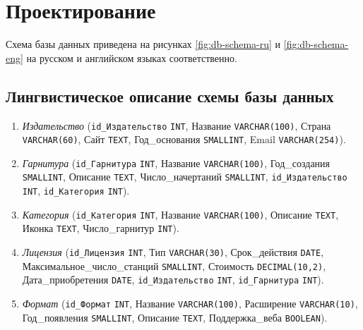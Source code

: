 \section{Проектирование}
Схема базы данных приведена на рисунках \ref{fig:db-schema-ru} и \ref{fig:db-schema-eng} на русском и английском языках соответственно.

\subsection{Лингвистическое описание схемы базы данных}

\begin{enumerate}
    \item \textit{Издательство} (\texttt{id_Издательство} \texttt{INT},
    Название \texttt{VARCHAR(100)},
    Страна \texttt{VARCHAR(60)},
    Сайт \texttt{TEXT},
    Год\_основания \texttt{SMALLINT},
    Email \texttt{VARCHAR(254)}).

    \item \textit{Гарнитура} (\texttt{id_Гарнитура} \texttt{INT},
    Название \texttt{VARCHAR(100)},
    Год\_создания \texttt{SMALLINT},
    Описание \texttt{TEXT},
    Число\_начертаний \texttt{SMALLINT},
    \texttt{id_Издательство} \texttt{INT},
    \texttt{id_Категория} \texttt{INT}).

    \item \textit{Категория} (\texttt{id_Категория} \texttt{INT},
    Название \texttt{VARCHAR(100)},
    Описание \texttt{TEXT},
    Иконка \texttt{TEXT},
    Число\_гарнитур \texttt{INT}).

    \item \textit{Лицензия} (\texttt{id_Лицензия} \texttt{INT},
    Тип \texttt{VARCHAR(30)},
    Срок\_действия \texttt{DATE},
    Максимальное\_число\_станций \texttt{SMALLINT},
    Стоимость \texttt{DECIMAL(10,2)},\newline
    Дата\_приобретения \texttt{DATE},
    \texttt{id_Издательство} \texttt{INT},
    \texttt{id_Гарнитура} \texttt{INT}).

    \item \textit{Формат} (\texttt{id_Формат} \texttt{INT},
    Название \texttt{VARCHAR(100)},
    Расширение \texttt{VARCHAR(10)},
    Год\_появления \texttt{SMALLINT},
    Описание \texttt{TEXT},
    Поддержка\_веба \texttt{BOOLEAN}).


\end{enumerate}
